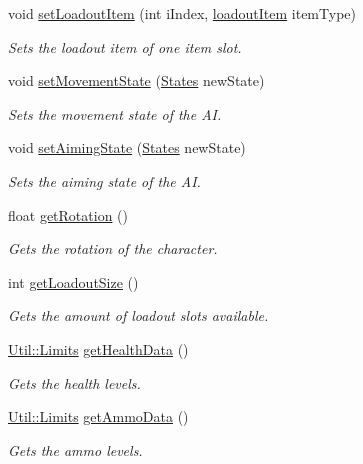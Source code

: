 \begin{DoxyCompactItemize}
void \hyperlink{class_character_a6aafe288415f66eef9f244f72406415d}{set\+Loadout\+Item} (int i\+Index, \hyperlink{_character_8h_a00971beaa8e80879643e933973580d61}{loadout\+Item} item\+Type)
\begin{DoxyCompactList}\small\item\em Sets the loadout item of one item slot. \end{DoxyCompactList}\item 
void \hyperlink{class_character_a8411872ea649afb42dea6f530af79704}{set\+Movement\+State} (\hyperlink{_character_8h_a808e5cd4979462d3bbe3070d7d147444}{States} new\+State)
\begin{DoxyCompactList}\small\item\em Sets the movement state of the AI. \end{DoxyCompactList}\item 
void \hyperlink{class_character_a4fdc243fc7681fa8fd8dec2cbed595fe}{set\+Aiming\+State} (\hyperlink{_character_8h_a808e5cd4979462d3bbe3070d7d147444}{States} new\+State)
\begin{DoxyCompactList}\small\item\em Sets the aiming state of the AI. \end{DoxyCompactList}\item 
float \hyperlink{class_character_ae60bb73ddd9c7175c78f61a8332ea8f4}{get\+Rotation} ()
\begin{DoxyCompactList}\small\item\em Gets the rotation of the character. \end{DoxyCompactList}\item 
int \hyperlink{class_character_a555596279fd74ebe904f2d54885abb55}{get\+Loadout\+Size} ()
\begin{DoxyCompactList}\small\item\em Gets the amount of loadout slots available. \end{DoxyCompactList}\item 
\hyperlink{struct_util_1_1_limits}{Util\+::\+Limits} \hyperlink{class_character_ac1985a83e63950e7ac87ce69ea28684f}{get\+Health\+Data} ()
\begin{DoxyCompactList}\small\item\em Gets the health levels. \end{DoxyCompactList}\item 
\hyperlink{struct_util_1_1_limits}{Util\+::\+Limits} \hyperlink{class_character_a72edf0df90187cc5f8628e46c4124eef}{get\+Ammo\+Data} ()
\begin{DoxyCompactList}\small\item\em Gets the ammo levels. \end{DoxyCompactList}\item 

\end{DoxyCompactItemize}
